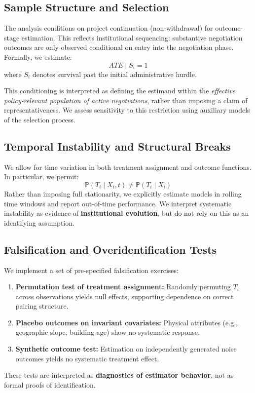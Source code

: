 \documentclass[11pt, letterpaper, oneside]{article}
\begin{document}
\subsection{Sample Structure and Selection}

The analysis conditions on project continuation (non-withdrawal) for outcome-stage estimation. This reflects institutional sequencing: substantive negotiation outcomes are only observed conditional on entry into the negotiation phase. Formally, we estimate:
\begin{equation}
ATE \mid S_i = 1
\end{equation}
where $S_i$ denotes survival past the initial administrative hurdle. 

This conditioning is interpreted as defining the estimand within the \textit{effective policy-relevant population of active negotiations}, rather than imposing a claim of representativeness. We assess sensitivity to this restriction using auxiliary models of the selection process.

\subsection{Temporal Instability and Structural Breaks}

We allow for time variation in both treatment assignment and outcome functions. In particular, we permit:
\begin{equation}
\mathbb{P}(T_i \mid X_i, t) \neq \mathbb{P}(T_i \mid X_i)
\end{equation}
Rather than imposing full stationarity, we explicitly estimate models in rolling time windows and report out-of-time performance. We interpret systematic instability as evidence of \textbf{institutional evolution}, but do not rely on this as an identifying assumption.

\subsection{Falsification and Overidentification Tests}

We implement a set of pre-specified falsification exercises:
\begin{enumerate}
    \item \textbf{Permutation test of treatment assignment:} Randomly permuting $T_i$ across observations yields null effects, supporting dependence on correct pairing structure.
    \item \textbf{Placebo outcomes on invariant covariates:} Physical attributes (e.g., geographic slope, building age) show no systematic response.
    \item \textbf{Synthetic outcome test:} Estimation on independently generated noise outcomes yields no systematic treatment effect.
\end{enumerate}
These tests are interpreted as \textbf{diagnostics of estimator behavior}, not as formal proofs of identification.
\end{document}
